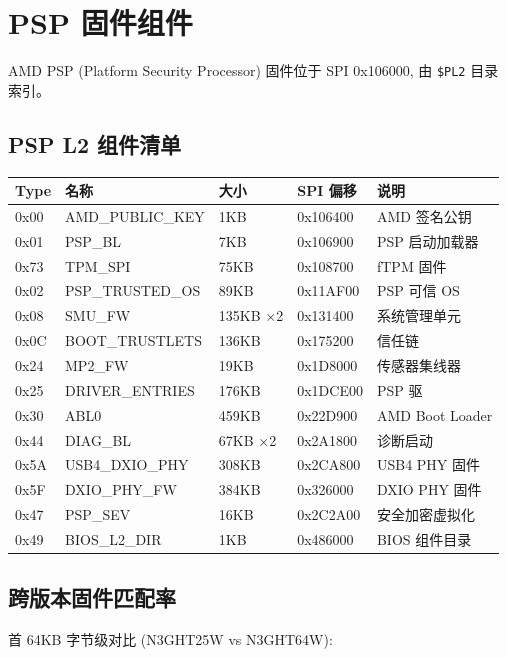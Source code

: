 \documentclass[a4paper,11pt,fontset=none]{ctexart}
\begin{document}
\section{PSP 固件组件}

AMD PSP (Platform Security Processor) 固件位于 SPI 0x106000, 由 \texttt{\$PL2} 目录索引。

\subsection{PSP L2 组件清单}

\begin{longtable}{R{1cm} p{3.5cm} R{1.5cm} R{2.5cm} p{3cm}}
  \toprule
  \textbf{Type} & \textbf{名称} & \textbf{大小} & \textbf{SPI 偏移} & \textbf{说明} \\
  \midrule
  \endhead
  0x00 & AMD\_PUBLIC\_KEY & 1KB & 0x106400 & AMD 签名公钥 \\
  0x01 & PSP\_BL & 7KB & 0x106900 & PSP 启动加载器 \\
  0x73 & TPM\_SPI & 75KB & 0x108700 & fTPM 固件 \\
  0x02 & PSP\_TRUSTED\_OS & 89KB & 0x11AF00 & PSP 可信 OS \\
  0x08 & SMU\_FW & 135KB ×2 & 0x131400 & 系统管理单元 \\
  0x0C & BOOT\_TRUSTLETS & 136KB & 0x175200 & 信任链 \\
  0x24 & MP2\_FW & 19KB & 0x1D8000 & 传感器集线器 \\
  0x25 & DRIVER\_ENTRIES & 176KB & 0x1DCE00 & PSP 驱 \\
  0x30 & ABL0 & 459KB & 0x22D900 & AMD Boot Loader \\
  0x44 & DIAG\_BL & 67KB ×2 & 0x2A1800 & 诊断启动 \\
  0x5A & USB4\_DXIO\_PHY & 308KB & 0x2CA800 & USB4 PHY 固件 \\
  0x5F & DXIO\_PHY\_FW & 384KB & 0x326000 & DXIO PHY 固件 \\
  0x47 & PSP\_SEV & 16KB & 0x2C2A00 & 安全加密虚拟化 \\
  0x49 & BIOS\_L2\_DIR & 1KB & 0x486000 & BIOS 组件目录 \\
  \bottomrule
\end{longtable}

\subsection{跨版本固件匹配率}

首 64KB 字节级对比 (N3GHT25W vs N3GHT64W):
\end{document}
